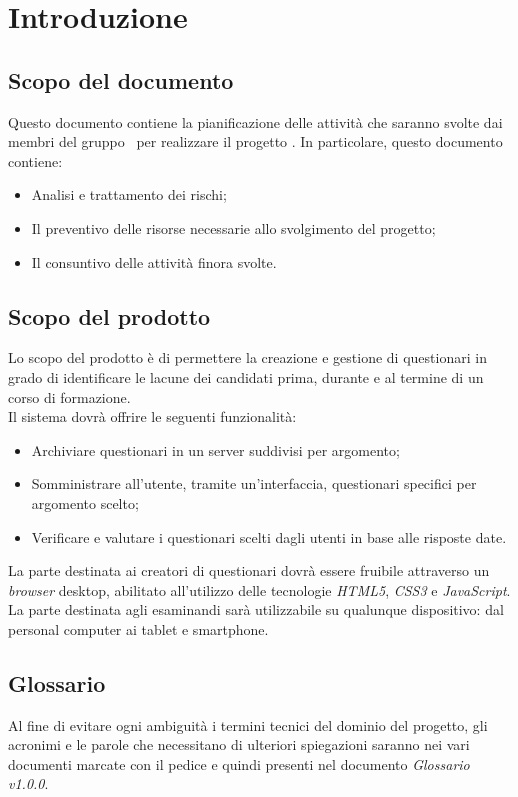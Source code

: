 \section{Introduzione}
\subsection{Scopo del documento}
Questo documento contiene la pianificazione delle attività che saranno svolte dai membri del gruppo \gruppo\ per realizzare il progetto \progetto. In particolare, questo documento contiene:

	\begin{itemize}
		\item Analisi e trattamento dei rischi;
		\item Il preventivo delle risorse necessarie allo svolgimento del progetto;
		\item Il consuntivo delle attività finora svolte.
	\end{itemize}
	
\subsection{Scopo del prodotto}
Lo scopo del prodotto è di permettere la creazione e gestione di questionari in grado di identificare le lacune dei candidati prima, durante e al termine di un corso di formazione. 
\\Il sistema dovrà offrire le seguenti funzionalità:
\begin{itemize}
	\item
	Archiviare questionari in un server suddivisi per argomento;
	\item
	Somministrare all'utente, tramite un'interfaccia, questionari specifici per argomento scelto;
	\item
	Verificare e valutare i questionari scelti dagli utenti in base alle risposte date.
\end{itemize}
La parte destinata ai creatori di questionari dovrà essere fruibile attraverso un \textit{browser} desktop, abilitato all'utilizzo delle tecnologie \textit{HTML5}, \textit{CSS3} e \textit{JavaScript}. La parte destinata agli esaminandi sarà utilizzabile su qualunque dispositivo: dal personal computer ai tablet e smartphone.

\subsection{Glossario}
Al fine di evitare ogni ambiguità i termini tecnici del dominio del progetto, gli acronimi e le parole che necessitano di ulteriori spiegazioni saranno nei vari documenti marcate con il pedice  e quindi presenti nel documento \textit{Glossario v1.0.0}.
